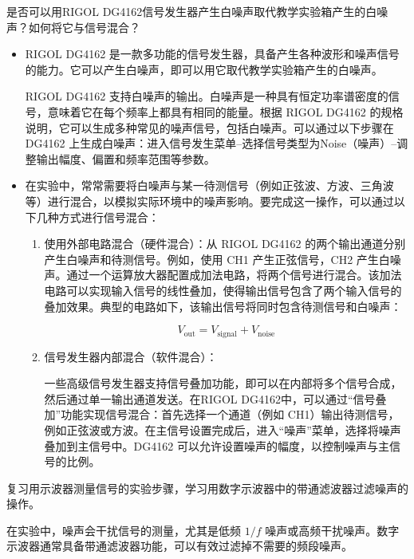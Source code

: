 \begin{question}
	是否可以用RIGOL DG4162信号发生器产生白噪声取代教学实验箱产生的白噪声？如何将它与信号混合？
\end{question}
\begin{itemize}
	\item RIGOL DG4162 是一款多功能的信号发生器，具备产生各种波形和噪声信号的能力。它可以产生白噪声，即可以用它取代教学实验箱产生的白噪声。
	
	RIGOL DG4162 支持白噪声的输出。白噪声是一种具有恒定功率谱密度的信号，意味着它在每个频率上都具有相同的能量。根据 RIGOL DG4162 的规格说明，它可以生成多种常见的噪声信号，包括白噪声。可以通过以下步骤在 DG4162 上生成白噪声：进入信号发生菜单--选择信号类型为Noise（噪声）--调整输出幅度、偏置和频率范围等参数。
	
	\item 在实验中，常常需要将白噪声与某一待测信号（例如正弦波、方波、三角波等）进行混合，以模拟实际环境中的噪声影响。要完成这一操作，可以通过以下几种方式进行信号混合：
	\begin{enumerate}
		\item 使用外部电路混合（硬件混合）：从 RIGOL DG4162 的两个输出通道分别产生白噪声和待测信号。例如，使用 CH1 产生正弦信号，CH2 产生白噪声。通过一个运算放大器配置成加法电路，将两个信号进行混合。该加法电路可以实现输入信号的线性叠加，使得输出信号包含了两个输入信号的叠加效果。典型的电路如下，该输出信号将同时包含待测信号和白噪声：
		 
		\[
		V_{\text{out}} = V_{\text{signal}} + V_{\text{noise}}
		\]
		
		\item  信号发生器内部混合（软件混合）：
		
		一些高级信号发生器支持信号叠加功能，即可以在内部将多个信号合成，然后通过单一输出通道发送。在RIGOL DG4162中，可以通过“信号叠加”功能实现信号混合：首先选择一个通道（例如 CH1）输出待测信号，例如正弦波或方波。在主信号设置完成后，进入“噪声”菜单，选择将噪声叠加到主信号中。DG4162 可以允许设置噪声的幅度，以控制噪声与主信号的比例。
	\end{enumerate}
\end{itemize}

\begin{question}
	复习用示波器测量信号的实验步骤，学习用数字示波器中的带通滤波器过滤噪声的操作。
\end{question}
在实验中，噪声会干扰信号的测量，尤其是低频 $1/f$ 噪声或高频干扰噪声。数字示波器通常具备带通滤波器功能，可以有效过滤掉不需要的频段噪声。

